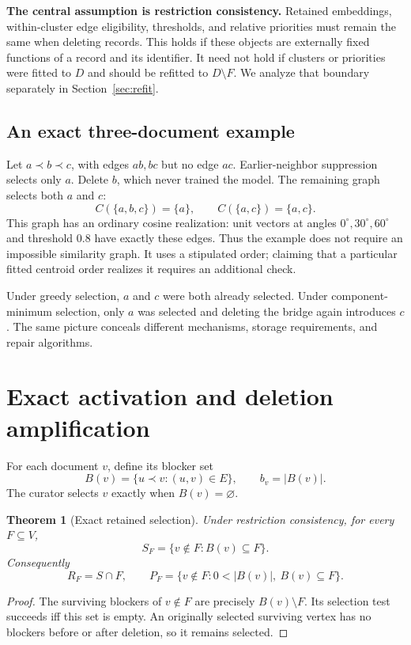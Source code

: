 \documentclass[11pt,a4paper]{article}
\newtheorem{theorem}{Theorem}[section]
\theoremstyle{definition}\newtheorem{definition}[theorem]{Definition}
\newcommand{\minus}{\setminus}
\begin{document}
\textbf{The central assumption is restriction consistency.} Retained embeddings, within-cluster edge eligibility, thresholds, and relative priorities must remain the same when deleting records. This holds if these objects are externally fixed functions of a record and its identifier. It need not hold if clusters or priorities were fitted to $D$ and should be refitted to $D\minus F$. We analyze that boundary separately in Section~\ref{sec:refit}.

\subsection{An exact three-document example}
Let $a\prec b\prec c$, with edges $ab,bc$ but no edge $ac$. Earlier-neighbor suppression selects only $a$. Delete $b$, which never trained the model. The remaining graph selects both $a$ and $c$:
\[
 C(\{a,b,c\})=\{a\},\qquad C(\{a,c\})=\{a,c\}.
\]
This graph has an ordinary cosine realization: unit vectors at angles $0^\circ,30^\circ,60^\circ$ and threshold $0.8$ have exactly these edges. Thus the example does not require an impossible similarity graph. It uses a stipulated order; claiming that a particular fitted centroid order realizes it requires an additional check.

Under greedy selection, $a$ and $c$ were both already selected. Under component-minimum selection, only $a$ was selected and deleting the bridge again introduces $c$. The same picture conceals different mechanisms, storage requirements, and repair algorithms.

\section{Exact activation and deletion amplification}
For each document $v$, define its blocker set
\[
 B(v)=\{u\prec v:(u,v)\in E\},\qquad b_v=|B(v)|.
\]
The curator selects $v$ exactly when $B(v)=\varnothing$.

\begin{theorem}[Exact retained selection]\label{thm:activation}
Under restriction consistency, for every $F\subseteq V$,
\begin{equation}\label{eq:activation}
 S_F=\{v\notin F:B(v)\subseteq F\}.
\end{equation}
Consequently
\[
 R_F=S\cap F,\qquad
 P_F=\{v\notin F:0<|B(v)|,\ B(v)\subseteq F\}.
\]
\end{theorem}
\begin{proof}
The surviving blockers of $v\notin F$ are precisely $B(v)\minus F$. Its selection test succeeds iff this set is empty. An originally selected surviving vertex has no blockers before or after deletion, so it remains selected.
\end{proof}
\end{document}
